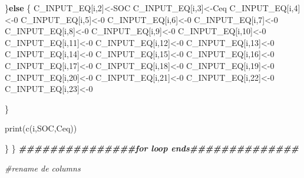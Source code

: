 \documentclass[
  10pt,
  b5paper,
]{book}
\newenvironment{Shaded}{\begin{snugshade}}{\end{snugshade}}
\newcommand{\CommentTok}[1]{\textcolor[rgb]{0.56,0.35,0.01}{\textit{#1}}}
\newcommand{\ControlFlowTok}[1]{\textcolor[rgb]{0.13,0.29,0.53}{\textbf{#1}}}
\newcommand{\DecValTok}[1]{\textcolor[rgb]{0.00,0.00,0.81}{#1}}
\newcommand{\DocumentationTok}[1]{\textcolor[rgb]{0.56,0.35,0.01}{\textbf{\textit{#1}}}}
\newcommand{\FunctionTok}[1]{\textcolor[rgb]{0.00,0.00,0.00}{#1}}
\newcommand{\NormalTok}[1]{#1}
\newcommand{\OtherTok}[1]{\textcolor[rgb]{0.56,0.35,0.01}{#1}}
\begin{document}
\begin{Shaded}
\begin{Highlighting}[]
\NormalTok{\}}\ControlFlowTok{else}\NormalTok{ \{}
\NormalTok{C\_INPUT\_EQ[i,}\DecValTok{2}\NormalTok{]}\OtherTok{\textless{}{-}}\NormalTok{SOC}
\NormalTok{C\_INPUT\_EQ[i,}\DecValTok{3}\NormalTok{]}\OtherTok{\textless{}{-}}\NormalTok{Ceq}
\NormalTok{C\_INPUT\_EQ[i,}\DecValTok{4}\NormalTok{]}\OtherTok{\textless{}{-}}\DecValTok{0}
\NormalTok{C\_INPUT\_EQ[i,}\DecValTok{5}\NormalTok{]}\OtherTok{\textless{}{-}}\DecValTok{0}
\NormalTok{C\_INPUT\_EQ[i,}\DecValTok{6}\NormalTok{]}\OtherTok{\textless{}{-}}\DecValTok{0}
\NormalTok{C\_INPUT\_EQ[i,}\DecValTok{7}\NormalTok{]}\OtherTok{\textless{}{-}}\DecValTok{0}
\NormalTok{C\_INPUT\_EQ[i,}\DecValTok{8}\NormalTok{]}\OtherTok{\textless{}{-}}\DecValTok{0}
\NormalTok{C\_INPUT\_EQ[i,}\DecValTok{9}\NormalTok{]}\OtherTok{\textless{}{-}}\DecValTok{0}
\NormalTok{C\_INPUT\_EQ[i,}\DecValTok{10}\NormalTok{]}\OtherTok{\textless{}{-}}\DecValTok{0}
\NormalTok{C\_INPUT\_EQ[i,}\DecValTok{11}\NormalTok{]}\OtherTok{\textless{}{-}}\DecValTok{0}
\NormalTok{C\_INPUT\_EQ[i,}\DecValTok{12}\NormalTok{]}\OtherTok{\textless{}{-}}\DecValTok{0}
\NormalTok{C\_INPUT\_EQ[i,}\DecValTok{13}\NormalTok{]}\OtherTok{\textless{}{-}}\DecValTok{0}
\NormalTok{C\_INPUT\_EQ[i,}\DecValTok{14}\NormalTok{]}\OtherTok{\textless{}{-}}\DecValTok{0}
\NormalTok{C\_INPUT\_EQ[i,}\DecValTok{15}\NormalTok{]}\OtherTok{\textless{}{-}}\DecValTok{0}
\NormalTok{C\_INPUT\_EQ[i,}\DecValTok{16}\NormalTok{]}\OtherTok{\textless{}{-}}\DecValTok{0}
\NormalTok{C\_INPUT\_EQ[i,}\DecValTok{17}\NormalTok{]}\OtherTok{\textless{}{-}}\DecValTok{0}
\NormalTok{C\_INPUT\_EQ[i,}\DecValTok{18}\NormalTok{]}\OtherTok{\textless{}{-}}\DecValTok{0}
\NormalTok{C\_INPUT\_EQ[i,}\DecValTok{19}\NormalTok{]}\OtherTok{\textless{}{-}}\DecValTok{0}
\NormalTok{C\_INPUT\_EQ[i,}\DecValTok{20}\NormalTok{]}\OtherTok{\textless{}{-}}\DecValTok{0}
\NormalTok{C\_INPUT\_EQ[i,}\DecValTok{21}\NormalTok{]}\OtherTok{\textless{}{-}}\DecValTok{0}
\NormalTok{C\_INPUT\_EQ[i,}\DecValTok{22}\NormalTok{]}\OtherTok{\textless{}{-}}\DecValTok{0}
\NormalTok{C\_INPUT\_EQ[i,}\DecValTok{23}\NormalTok{]}\OtherTok{\textless{}{-}}\DecValTok{0}

\NormalTok{\}}

\FunctionTok{print}\NormalTok{(}\FunctionTok{c}\NormalTok{(i,SOC,Ceq))}

\NormalTok{\}}
\NormalTok{\}}
\DocumentationTok{\#\#\#\#\#\#\#\#\#\#\#\#\#\#\#for loop ends\#\#\#\#\#\#\#\#\#\#\#\#\#\#}


\CommentTok{\#rename de columns}


\end{Highlighting}
\end{Shaded}
\end{document}
